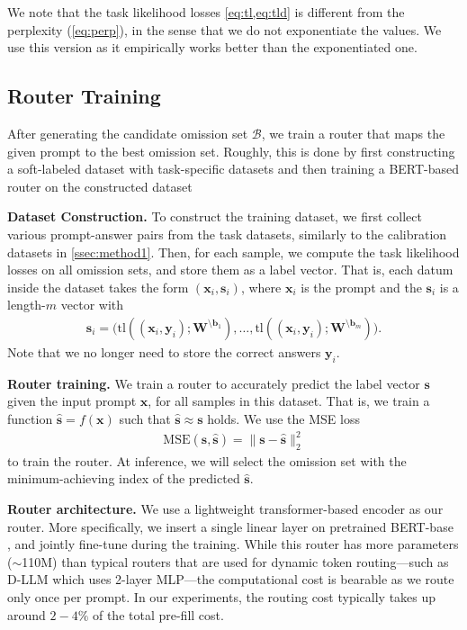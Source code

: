 We note that the task likelihood losses \cref{eq:tl,eq:tld} is different from the perplexity (\cref{eq:perp}), in the sense that we do not exponentiate the values. We use this version as it empirically works better than the exponentiated one.


\subsection{Router Training}\label{ssec:method2}

After generating the candidate omission set $\mathcal{B}$, we train a router that maps the given prompt to the best omission set. Roughly, this is done by first constructing a soft-labeled dataset with task-specific datasets and then training a BERT-based router on the constructed dataset \citep{devlin19}

\textbf{Dataset Construction.} To construct the training dataset, we first collect various prompt-answer pairs from the task datasets, similarly to the calibration datasets in \cref{ssec:method1}. Then, for each sample, we compute the task likelihood losses on all omission sets, and store them as a label vector. That is, each datum inside the dataset takes the form $(\mathbf{x}_i,\mathbf{s}_i)$, where $\mathbf{x}_i$ is the prompt and the $\mathbf{s}_i$ is a length-$m$ vector with
\begin{align}
\mathbf{s}_i = \big(\mathrm{tl}((\mathbf{x}_i,\mathbf{y}_i);\mathbf{W}^{\setminus \mathbf{b}_1}),\ldots, \mathrm{tl}((\mathbf{x}_i,\mathbf{y}_i);\mathbf{W}^{\setminus \mathbf{b}_m})\big).
\end{align}
Note that we no longer need to store the correct answers $\mathbf{y}_i$.

\textbf{Router training.} We train a router to accurately predict the label vector $\mathbf{s}$ given the input prompt $\mathbf{x}$, for all samples in this dataset. That is, we train a function $\hat{\mathbf{s}} = f(\mathbf{x})$ such that $\hat{\mathbf{s}} \approx \mathbf{s}$ holds. We use the MSE loss
\begin{align}
\mathrm{MSE}(\mathbf{s},\hat{\mathbf{s}}) = \big\|\mathbf{s} - \hat{\mathbf{s}}\big\|^2_2
\end{align}
to train the router.
At inference, we will select the omission set with the minimum-achieving index of the predicted $\hat{\mathbf{s}}$.

\textbf{Router architecture.} We use a lightweight transformer-based encoder as our router. More specifically, we insert a single linear layer on pretrained BERT-base \citep{devlin19}, and jointly fine-tune during the training. While this router has more parameters ($\sim$110M) than typical routers that are used for dynamic token routing---such as D-LLM \citep{wangd} which uses 2-layer MLP---the computational cost is bearable as we route only once per prompt. In our experiments, the routing cost typically takes up around $2-4\%$ of the total pre-fill cost.

